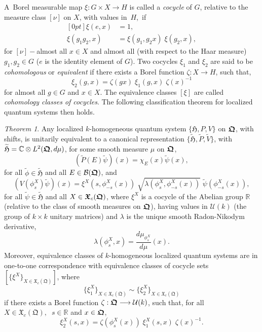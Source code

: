 \documentclass[12pt]{amsart}
\numberwithin{equation}{section}
\theoremstyle{remark}
\newcommand\HH{\mathfrak H}
\newtheorem{theorem}[defi]{Theorem}
\newcommand{\betheo}{\begin{theorem}}
\newcommand{\entheo}{\end{theorem}}
\newcommand{\be}{\begin{equation}}
\newcommand{\en}{\end{equation}}
\newcommand{\htil}{\widetilde{\mathfrak H}}
\newcommand{\bfrakQ}{\mbox{\boldmath $\mathfrak Q$}}
\newcommand{\bfrakX}{\mbox{\boldmath $\mathfrak X$}}
\begin{document}
A~Borel measurable map $\xi :G \times X \longrightarrow H$ is called a {\em
cocycle} of $G$, relative to the measure class $[\nu ]$ on $X$, with values
in~$H$,~if
\be \begin{aligned}[0pt]
  \xi (e, x ) & =  1, \\
  \xi (g_1 g_2 , x ) & =  \xi (g_1 , g_2 x )\;\xi(g_2 , x ),
\end{aligned}  \label{cocycle1}  \en
for $[\nu ]-$almost all $x \in X$ and almost all (with respect to the Haar
measure) $g_1 , g_2 \in G$ ($e$ is the identity element of $G$). Two cocycles
$\xi_1$ and $\xi_2$ are said to be {\em cohomologous} or {\em equivalent} if
there exists a Borel function $\zeta : X \longrightarrow H$, such that,
$$  \xi_2 (g, x) = \zeta (gx)\;\xi_1 (g, x)\;\zeta (x)^{-1} $$
for almost all $g \in G$ and $x \in X$. The  equivalence classes $[\xi ]$ are
called {\em cohomology classes of cocycles}. The following classification
theorem for localized quantum systems then holds.

\betheo
Any localized $k$-homogeneous quantum system $\{\HH , P, V\}$ on $\bfrakQ$,
with shifts, is unitarily equivalent to a canonical representation
$\{ \htil , \widetilde{P} , \widetilde{V}\}$, with $\htil =
{\mathbb C}\otimes L^2 (\bfrakQ , d\mu )$, for some smooth measure $\mu$ on
$\bfrakQ$,
$$ (\widetilde{P}(E)\widetilde\psi )(x) = \chi_E (x )\widetilde\psi (x), $$
for all $\widetilde\phi \in \htil$ and all $E \in {\mathcal B}(\bfrakQ )$, and
\be
  (V(\phi^X_s )\widetilde\psi )(x)= \xi^X (s, \phi^X_{-s}(x))\;
  \sqrt{\lambda (\phi^X_s , \phi^X_{-s}(x))}\; \widetilde\psi (\phi^X_{-s}(x)),
\label{grouprep1}
\en
for all $\widetilde\psi \in \htil$ and all $X \in \bfrakX_c (\bfrakQ )$, where
$\xi^X$ is a cocycle of the Abelian group $\mathbb R$ (relative to the class of
smooth measures on $\bfrakQ$), having values in ${\mathcal U}(k)$ (the group of
$k\times k$ unitary matrices) and $\lambda$ is the unique smooth Radon-Nikodym
derivative,
$$ \lambda (\phi^X_s , x ) = \frac {d\mu_{\phi^X_s}}{d\mu} (x) . $$
Moreover, equivalence classes of $k$-homogeneous localized quantum systems are
in one-to-one correspondence with equivalence classes of cocycle sets
$[\{\xi^X\}_{X \in {\mathfrak X}_c (\mathfrak Q )}]$, where
$$ \{\xi^X_1\}_{X \in {\mathfrak X}_c (\mathfrak Q )} \sim
    \{\xi^X_2\}_{X \in {\mathfrak X}_c (\mathfrak Q )} $$
if there exists a Borel function $\zeta:\bfrakQ\longrightarrow{\mathcal U}(k)$,
such that, for all $X \in {\mathfrak X}_c (\mathfrak Q ),\;\; s \in \mathbb R$
and  $x \in \bfrakQ$,
$$ \xi^X_2 (s,x ) = \zeta (\phi^X_s (x))\;\xi^X_1 (s,x)\;\zeta(x)^{-1}. $$
\entheo
\end{document}

